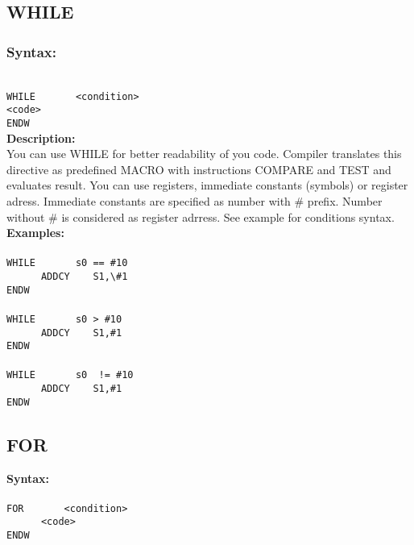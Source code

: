     \subsection{WHILE}
        \subsubsection{Syntax:}
        {
            ~\\
            \usecodefont
            \verb'WHILE       <condition>'\\
            \verb'<code>'\\
            \verb'ENDW'
        }\\
        
        \textbf{Description:}\\
        You can use WHILE for better readability of you code. Compiler translates this directive as predefined MACRO with instructions COMPARE and TEST and
        evaluates result. You can use registers, immediate constants (symbols) or register adress. Immediate constants are specified as number with \# prefix.
        Number without \# is considered as register adrress. See example for conditions syntax.\\
        \textbf{Examples:}\\
        {
            ~\\
            \usecodefont
            \verb'WHILE       s0 == #10'\\
            \verb'      ADDCY    S1,\#1'\\
            \verb'ENDW'
        }\\
        {
            ~\\
            \usecodefont
            \verb'WHILE       s0 > #10'\\
            \verb'      ADDCY    S1,#1'\\
            \verb'ENDW'
        }\\
        {
            ~\\
            \usecodefont
            \verb'WHILE       s0  != #10'\\
            \verb'      ADDCY    S1,#1'\\
            \verb'ENDW'
        }\\

        \subsection{FOR}
            \textbf{Syntax:}\\
        {
            ~\\
            \usecodefont
            \verb'FOR       <condition>'\\
            \verb'      <code>'\\
            \verb'ENDW'
        }\\
        
